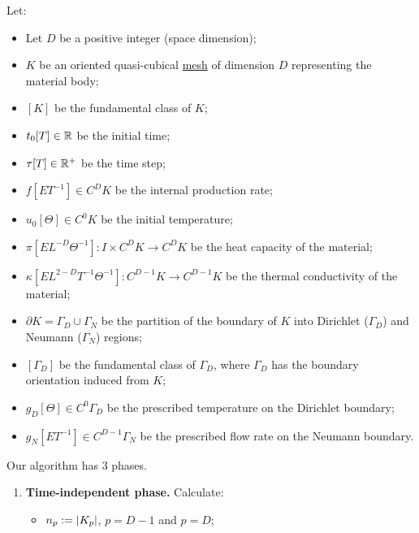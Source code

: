 \begin{algorithm}
  \label{cmc/diffusion/discrete/transient/mixed_weak_solve_trapezoidal-algorithm}
  Let:
  \begin{itemize}
    \item
      Let $D$ be a positive integer (space dimension);
    \item
      $K$ be an oriented quasi-cubical \hyperref[cmc:mesh:definition]{mesh} of
      dimension $D$ representing the material body;
    \item
      $[K]$ be the fundamental class of $K$;
    \item
      $t_0 [T] \in \mathbb{R}$ be the initial time;
    \item
      $\tau [T] \in \mathbb{R}^+$ be the time step;
    \item
      $f [E T^{-1}] \in C^D K$ be the internal production rate;
    \item
      $u_0 [\Theta] \in C^0 K$ be the initial temperature;
    \item
      $\pi [E L^{-D} \Theta^{-1}] \colon I \times C^D K \to C^D K$
      be the heat capacity of the material;
    \item
      $\kappa [E L^{2 - D} T^{-1} \Theta^{-1}]
        \colon C^{D - 1} K \to C^{D - 1} K$
      be the thermal conductivity of the material;
    \item
      $\partial K = \Gamma_D \cup \Gamma_N$ be the partition of the boundary of
      $K$ into Dirichlet ($\Gamma_D$) and Neumann ($\Gamma_N$) regions;
    \item
      $[\Gamma_D]$ be the fundamental class of $\Gamma_D$, where $\Gamma_D$
      has the boundary orientation induced from $K$;
    \item
      $g_D [\Theta] \in C^0 \Gamma_D$
      be the prescribed temperature on the Dirichlet boundary;
    \item
      $g_N [E T^{-1}] \in C^{D - 1} \Gamma_N$
      be the prescribed flow rate on the Neumann boundary.
  \end{itemize}
  Our algorithm has $3$ phases.
  \begin{enumerate}
    \item
      \textbf{Time-independent phase.}
      Calculate:
      \begin{itemize}
        \item
          $n_p := \left\lvert K_p\right\rvert$, $p = D - 1$ and $p = D$;

\end{itemize}
\end{enumerate}
\end{algorithm}
